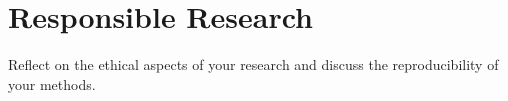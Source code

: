 \section{Responsible Research}
Reflect on the ethical aspects of your research and discuss the reproducibility of your methods.